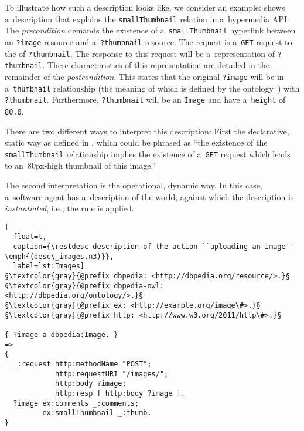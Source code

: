 To illustrate how such a \restdesc description looks like, we consider an example:  shows a~description
that explains the \verb!smallThumbnail! relation in a~hypermedia API.
The \emph{precondition} demands the existence of
a~\verb!smallThumbnail! hyperlink
between an \verb!?image! resource
and a~\verb!?thumbnail! resource.
The \http request
is a~\verb!GET! request to the \URL of \verb!?thumbnail!.
The response to this request will be a~representation of \verb!?thumbnail!.
These characteristics of this representation are detailed in the remainder of the \emph{postcondition}.
This states that the original \verb!?image!
will be in a~\verb!thumbnail! relationship
(the meaning of which is defined by the \dbpedia ontology~\cite{DBpedia})
with \verb!?thumbnail!.
Furthermore, \verb!?thumbnail! will be an \verb!Image!
and have a~\verb!height! of \verb!80.0!.

There are two different ways to interpret this description:
First the declarative, static way as defined in ,
which could be phrased as
\enquote{the existence of the \texttt{smallThumbnail} relationship
implies the existence of a~\texttt{GET} request
which leads to an~80px-high thumbnail of this image.}

The second interpretation is the operational, dynamic way.
In this case, a~software agent has a~description of the world,
against which the description is \emph{instantiated},
i.e., the rule is applied.

\begin{lstlisting}[
  float=t,
  caption={\restdesc description of the action ``uploading an image'' \emph{(desc\_images.n3)}},
  label=lst:Images]
§\textcolor{gray}{@prefix dbpedia: <http://dbpedia.org/resource/>.}§
§\textcolor{gray}{@prefix dbpedia-owl: <http://dbpedia.org/ontology/>.}§
§\textcolor{gray}{@prefix ex: <http://example.org/image\#>.}§
§\textcolor{gray}{@prefix http: <http://www.w3.org/2011/http\#>.}§

{ ?image a dbpedia:Image. }
=>
{
  _:request http:methodName "POST";
            http:requestURI "/images/";
            http:body ?image;
            http:resp [ http:body ?image ].
  ?image ex:comments _:comments;
         ex:smallThumbnail _:thumb.
}
\end{lstlisting}


